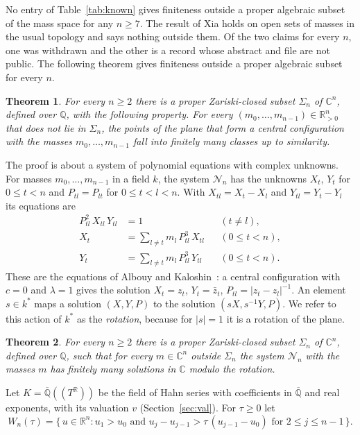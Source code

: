 \documentclass[11pt]{amsart}
\newtheorem{theorem}{Theorem}[section]
\theoremstyle{definition}
\theoremstyle{remark}
\numberwithin{equation}{section}
\newcommand{\QQ}{\mathbb{Q}}
\newcommand{\Qbar}{\overline{\mathbb{Q}}}
\newcommand{\CC}{\mathbb{C}}
\newcommand{\RR}{\mathbb{R}}
\newcommand{\cN}{\mathcal{N}}
\begin{document}
No entry of Table~\ref{tab:known} gives finiteness outside a proper algebraic subset of the mass space
for any $n \ge 7$. The result of Xia holds on open sets of masses in the usual topology and says nothing
outside them. Of the two claims for every $n$, one was withdrawn and the other is a record whose
abstract and file are not public. The following theorem gives finiteness outside a proper algebraic
subset for every $n$.

\begin{theorem}\label{thm:main}
For every $n \ge 2$ there is a proper Zariski-closed subset $\Sigma_n$ of $\CC^n$, defined over $\QQ$,
with the following property. For every $(m_0, \dots, m_{n-1}) \in \RR_{>0}^n$ that does not lie in
$\Sigma_n$, the points of the plane that form a central configuration with the masses
$m_0, \dots, m_{n-1}$ fall into finitely many classes up to similarity.
\end{theorem}

The proof is about a system of polynomial equations with complex unknowns. For masses $m_0, \dots, m_{n-1}$ in
a field $k$, the system $\cN_n$ has the unknowns $X_t$, $Y_t$ for $0 \le t < n$ and $P_{tl} = P_{lt}$ for
$0 \le t < l < n$. With $X_{tl} = X_t - X_l$ and $Y_{tl} = Y_t - Y_l$ its equations are
\begin{align}
  P_{tl}^2\, X_{tl}\, Y_{tl} &= 1 && (t \ne l), \label{eq:N1}\\
  X_t &= \sum_{l \ne t} m_l\, P_{tl}^3\, X_{tl} && (0 \le t < n), \label{eq:N2}\\
  Y_t &= \sum_{l \ne t} m_l\, P_{tl}^3\, Y_{tl} && (0 \le t < n). \label{eq:N3}
\end{align}
These are the equations of Albouy and Kaloshin~\cite{albouykaloshin2012}: a central configuration with
$c = 0$ and $\lambda = 1$ gives the solution $X_t = z_t$, $Y_t = \bar z_t$, $P_{tl} = |z_t - z_l|^{-1}$.
An element $s \in k^{*}$ maps a solution $(X, Y, P)$ to the solution $(sX, s^{-1}Y, P)$. We refer to
this action of $k^{*}$ as the \emph{rotation}, because for $|s| = 1$ it is a rotation of the plane.

\begin{theorem}\label{thm:Nn}
For every $n \ge 2$ there is a proper Zariski-closed subset $\Sigma_n$ of $\CC^n$, defined over $\QQ$,
such that for every $m \in \CC^n$ outside $\Sigma_n$ the system $\cN_n$ with the masses $m$ has finitely
many solutions in $\CC$ modulo the rotation.
\end{theorem}

Let $K = \Qbar((T^{\RR}))$ be the field of Hahn series with coefficients in $\Qbar$ and real exponents,
with its valuation $v$ (Section~\ref{sec:val}). For $\tau \ge 0$ let
\begin{equation}\label{eq:chamber}
  W_n(\tau) = \bigl\{\, u \in \RR^n : u_1 > u_0 \text{ and } u_j - u_{j-1} > \tau\,(u_{j-1} - u_0)
  \text{ for } 2 \le j \le n-1 \,\bigr\}.
\end{equation}
\end{document}
